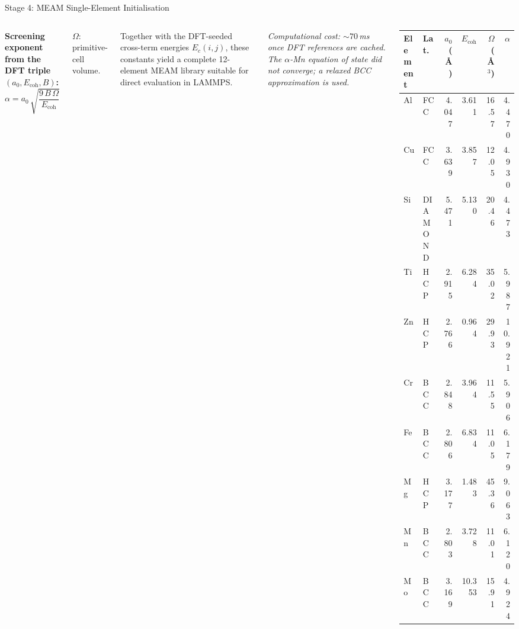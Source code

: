 \begin{frame}{Stage 4: MEAM Single-Element Initialisation}
\begin{columns}[T]
\textbf{Screening exponent from the DFT triple
$(a_{0}, E_{\mathrm{coh}}, B)$:}
\begin{equation*}
  \alpha = a_{0}\,\sqrt{\dfrac{9\,B\,\Omega}{E_{\mathrm{coh}}}}
\end{equation*}

\smallskip
$\Omega$: primitive-cell volume.

\bigskip
Together with the DFT-seeded cross-term energies $E_{c}(i, j)$,
these constants yield a complete 12-element MEAM library suitable
for direct evaluation in LAMMPS.

\bigskip
\scriptsize\textit{Computational cost: $\sim\!70$\,ms once DFT
references are cached. The $\alpha$-Mn equation of state did not
converge; a relaxed BCC approximation is used.}

\centering
\scriptsize
\setlength{\tabcolsep}{4pt}
\renewcommand{\arraystretch}{0.95}
\begin{tabular}{llrrrr}
\toprule
Element & Lat. & $a_{0}$ (\AA) & $E_{\mathrm{coh}}$ & $\Omega$ (\AA$^{3}$) & $\alpha$ \\
\midrule
Al & FCC     & 4.047 & 3.611 & 16.57 & 4.470 \\
Cu & FCC     & 3.639 & 3.857 & 12.05 & 4.930 \\
Si & DIAMOND & 5.471 & 5.130 & 20.46 & 4.473 \\
Ti & HCP     & 2.915 & 6.284 & 35.02 & 5.987 \\
Zn & HCP     & 2.766 & 0.964 & 29.93 &10.921 \\
Cr & BCC     & 2.848 & 3.964 & 11.55 & 5.906 \\
Fe & BCC     & 2.806 & 6.834 & 11.05 & 6.179 \\
Mg & HCP     & 3.177 & 1.483 & 45.36 & 9.063 \\
Mn & BCC     & 2.803 & 3.728 & 11.01 & 6.120 \\
Mo & BCC     & 3.169 &10.353 & 15.91 & 4.924 \\
\bottomrule
\end{tabular}
\end{columns}
\end{frame}

